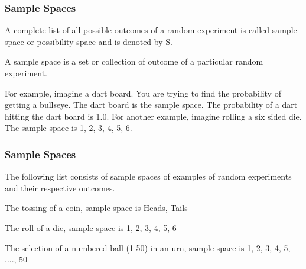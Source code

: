 \documentclass[IntroMain.tex]{subfiles}
\begin{document}


\begin{frame}
	\frametitle{Sample Spaces}
	
	
	A complete list of all possible outcomes of a random experiment is called sample space or possibility space and is denoted by S.
	
	
	A sample space is a set or collection of outcome of a particular random experiment.
	
	
	For example, imagine a dart board. You are trying to find the probability of getting a bullseye. The dart board is the sample space. The probability of a dart hitting the dart board is 1.0. For another example, imagine rolling a six sided die. The sample space is {1, 2, 3, 4, 5, 6}.
	
\end{frame}
\begin{frame}
	\frametitle{Sample Spaces}
	
	The following list consists of sample spaces of examples of random experiments and their respective outcomes.
	
	The tossing of a coin, sample space is {Heads, Tails}
	
	The roll of a die, sample space is {1, 2, 3, 4, 5, 6}
	
	The selection of a numbered ball (1-50) in an urn, sample space is {1, 2, 3, 4, 5, ...., 50}
	
\end{frame}
\end{document}
